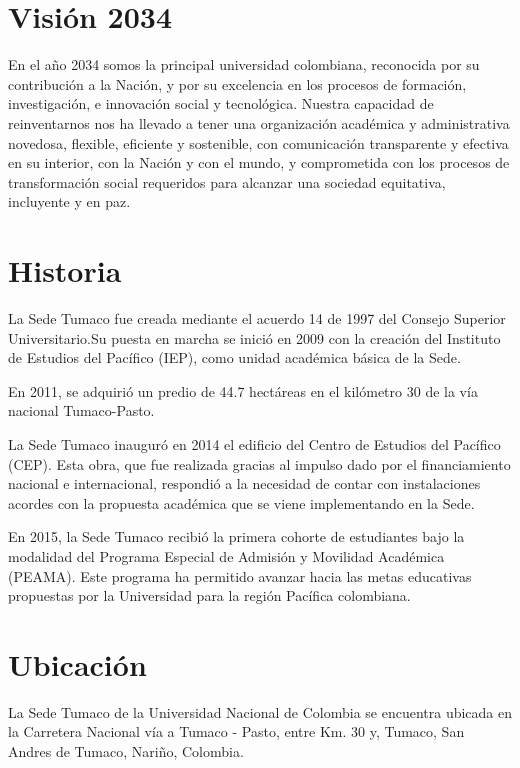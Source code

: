 \documentclass[
]{book}
\begin{document}
\hypertarget{vision}{%
\section*{Visión 2034}\label{vision}}

En el año 2034 somos la principal universidad colombiana, reconocida por su contribución a la Nación, y por su excelencia en los procesos de formación, investigación, e innovación social y tecnológica. Nuestra capacidad de reinventarnos nos ha llevado a tener una organización académica y administrativa novedosa, flexible, eficiente y sostenible, con comunicación transparente y efectiva en su interior, con la Nación y con el mundo, y comprometida con los procesos de transformación social requeridos para alcanzar una sociedad equitativa, incluyente y en paz.

\hypertarget{hist}{%
\section*{Historia}\label{hist}}

La Sede Tumaco fue creada mediante el acuerdo 14 de 1997 del Consejo Superior Universitario.Su puesta en marcha se inició en 2009 con la creación del Instituto de Estudios del Pacífico (IEP), como unidad académica básica de la Sede.

En 2011, se adquirió un predio de 44.7 hectáreas en el kilómetro 30 de la vía nacional Tumaco-Pasto.

La Sede Tumaco inauguró en 2014 el edificio del Centro de Estudios del Pacífico (CEP). Esta obra, que fue realizada gracias al impulso dado por el financiamiento nacional e internacional, respondió a la necesidad de contar con instalaciones acordes con la propuesta académica que se viene implementando en la Sede.

En 2015, la Sede Tumaco recibió la primera cohorte de estudiantes bajo la modalidad del Programa Especial de Admisión y Movilidad Académica (PEAMA). Este programa ha permitido avanzar hacia las metas educativas propuestas por la Universidad para la región Pacífica colombiana.

\hypertarget{ubica}{%
\section*{Ubicación}\label{ubica}}

La Sede Tumaco de la Universidad Nacional de Colombia se encuentra ubicada en la Carretera Nacional vía a Tumaco - Pasto, entre Km. 30 y, Tumaco, San Andres de Tumaco, Nariño, Colombia.
\end{document}
